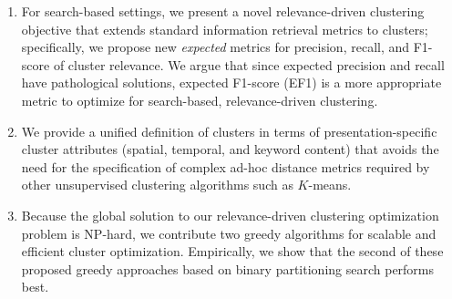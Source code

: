 \begin{enumerate}[topsep=0pt,leftmargin=*]
\item For search-based settings, we present a novel relevance-driven clustering objective that extends standard information retrieval metrics to clusters; specifically, we propose new \emph{expected} metrics for precision, recall, and F1-score of cluster relevance.  We argue that since expected precision and recall have pathological solutions, expected F1-score (EF1) is a more appropriate metric to optimize for search-based, relevance-driven clustering.
\item We provide a unified definition of clusters in terms of presentation-specific cluster attributes (spatial, temporal, and keyword content) that avoids the need for the specification of complex ad-hoc distance metrics required by other unsupervised clustering algorithms such as $K$-means.  
\item Because the global solution to our relevance-driven clustering optimization problem is NP-hard, we contribute two greedy algorithms for scalable and efficient cluster optimization.  Empirically, we show that the second of these proposed greedy approaches based on binary partitioning search performs best.

\end{enumerate}
